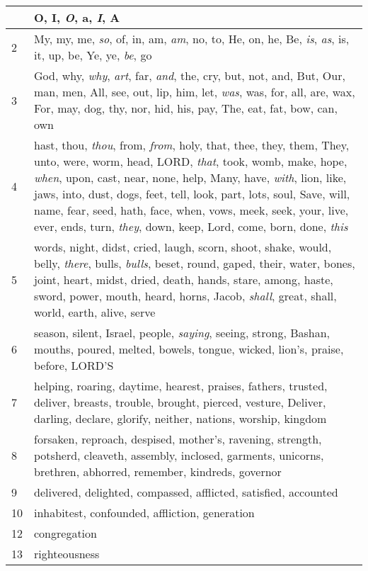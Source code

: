 \begin{longtable}{l|p{3.75in}}
\hline \hline
\endlastfoot
1 & O, I, \emph{O}, a, \emph{I}, A \\ \hline
2 & My, my, me, \emph{so}, of, in, am, \emph{am}, no, to, He, on, he, Be, \emph{is}, \emph{as}, is, it, up, be, Ye, ye, \emph{be}, go \\ \hline
3 & God, why, \emph{why}, \emph{art}, far, \emph{and}, the, cry, but, not, and, But, Our, man, men, All, see, out, lip, him, let, \emph{was}, was, for, all, are, wax, For, may, dog, thy, nor, hid, his, pay, The, eat, fat, bow, can, own \\ \hline
4 & hast, thou, \emph{thou}, from, \emph{from}, holy, that, thee, they, them, They, unto, were, worm, head, LORD, \emph{that}, took, womb, make, hope, \emph{when}, upon, cast, near, none, help, Many, have, \emph{with}, lion, like, jaws, into, dust, dogs, feet, tell, look, part, lots, soul, Save, will, name, fear, seed, hath, face, when, vows, meek, seek, your, live, ever, ends, turn, \emph{they}, down, keep, Lord, come, born, done, \emph{this} \\ \hline
5 & words, night, didst, cried, laugh, scorn, shoot, shake, would, belly, \emph{there}, bulls, \emph{bulls}, beset, round, gaped, their, water, bones, joint, heart, midst, dried, death, hands, stare, among, haste, sword, power, mouth, heard, horns, Jacob, \emph{shall}, great, shall, world, earth, alive, serve \\ \hline
6 & season, silent, Israel, people, \emph{saying}, seeing, strong, Bashan, mouths, poured, melted, bowels, tongue, wicked, lion's, praise, before, LORD'S \\ \hline
7 & helping, roaring, daytime, hearest, praises, fathers, trusted, deliver, breasts, trouble, brought, pierced, vesture, Deliver, darling, declare, glorify, neither, nations, worship, kingdom \\ \hline
8 & forsaken, reproach, despised, mother's, ravening, strength, potsherd, cleaveth, assembly, inclosed, garments, unicorns, brethren, abhorred, remember, kindreds, governor \\ \hline
9 & delivered, delighted, compassed, afflicted, satisfied, accounted \\ \hline
10 & inhabitest, confounded, affliction, generation \\ \hline
12 & congregation \\ \hline
13 & righteousness \\ \hline
\end{longtable}






